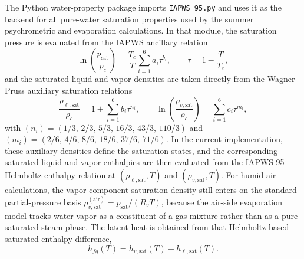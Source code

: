\documentclass[11pt]{article}
\newcommand{\filepath}[1]{\nolinkurl{#1}}
\begin{document}
The Python water-property package imports \filepath{IAPWS_95.py} and uses it as the backend for all pure-water saturation properties used by the summer psychrometric and evaporation calculations. In that module, the saturation pressure is evaluated from the IAPWS ancillary relation
\begin{equation}
\label{eq:psat_iapws}
\ln\!\left(\frac{p_{\mathrm{sat}}}{p_c}\right)=\frac{T_c}{T}\sum_{i=1}^{6}a_i\tau^{b_i},
\qquad
\tau=1-\frac{T}{T_c},
\end{equation}
and the saturated liquid and vapor densities are taken directly from the Wagner--Pruss auxiliary saturation relations
\begin{equation}
\label{eq:sat_density_iapws95}
\frac{\rho_{\ell,\mathrm{sat}}}{\rho_c}
=
1+\sum_{i=1}^{6} b_i \tau^{n_i},
\qquad
\ln\!\left(\frac{\rho_{v,\mathrm{sat}}}{\rho_c}\right)
=
\sum_{i=1}^{6} c_i \tau^{m_i},
\end{equation}
with \((n_i)=(1/3,\,2/3,\,5/3,\,16/3,\,43/3,\,110/3)\) and \((m_i)=(2/6,\,4/6,\,8/6,\,18/6,\,37/6,\,71/6)\). In the current implementation, these auxiliary densities define the saturation states, and the corresponding saturated liquid and vapor enthalpies are then evaluated from the IAPWS-95 Helmholtz enthalpy relation at \((\rho_{\ell,\mathrm{sat}},T)\) and \((\rho_{v,\mathrm{sat}},T)\). For humid-air calculations, the vapor-component saturation density still enters on the standard partial-pressure basis \(\rho_{v,\mathrm{sat}}^{(\mathrm{air})}=p_{\mathrm{sat}}/(R_vT)\), because the air-side evaporation model tracks water vapor as a constituent of a gas mixture rather than as a pure saturated steam phase. The latent heat is obtained from that Helmholtz-based saturated enthalpy difference,
\begin{equation}
\label{eq:latent_heat_cc}
h_{fg}(T)=h_{v,\mathrm{sat}}(T)-h_{\ell,\mathrm{sat}}(T).
\end{equation}
\end{document}
